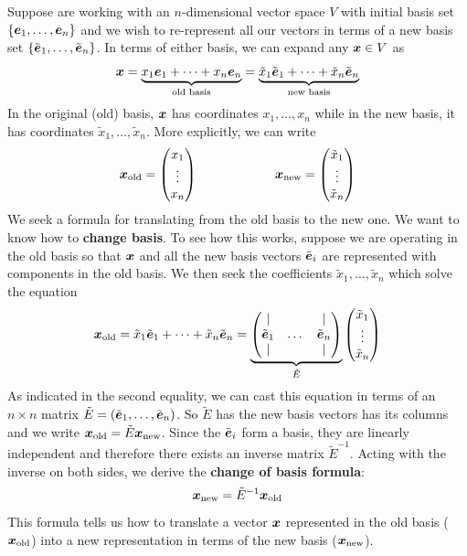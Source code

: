 \documentclass[onecolumn]{gwclass}
\begin{document}
Suppose are working with an $n$-dimensional vector space $V$ with initial basis set $\{\boldsymbol{e}_1,\dots,\boldsymbol{e}_n\}$ and we wish to re-represent all our vectors in terms of a new basis set $\{\tilde{\boldsymbol{e}}_1,\dots,\tilde{\boldsymbol{e}}_n\}$. In terms of either basis, we can expand any $\boldsymbol{x}\in V$ as
$$ \boldsymbol{x} = \underbrace{x_1\boldsymbol{e}_1 + \dots + x_n\boldsymbol{e}_n}_{\text{\normalfont{old basis}}} = \underbrace{\tilde{x}_1\tilde{\boldsymbol{e}}_1 + \dots + \tilde{x}_n\tilde{\boldsymbol{e}}_n}_{\text{\normalfont{new basis}}}
$$
In the original (old) basis, $\boldsymbol{x}$ has coordinates $x_1,\dots, x_n$ while in the new basis, it has coordinates $\tilde{x}_1,\dots,\tilde{x}_n$. More explicitly, we can write
$$\boldsymbol{x}_{\text{\normalfont{old}}}=\begin{pmatrix}
	x_1 \\
	\vdots \\
	x_n
\end{pmatrix} \qquad\qquad\qquad\boldsymbol{x}_{\text{\normalfont{new}}}=\begin{pmatrix}
	\tilde{x}_1 \\
	\vdots \\
	\tilde{x}_n
\end{pmatrix}$$
We seek a formula for translating from the old basis to the new one. We want to know how to \textbf{change basis}. To see how this works, suppose we are operating in the old basis so that $\boldsymbol{x}$ and all the new basis vectors $\tilde{\boldsymbol{e}}_i$ are represented with components in the old basis. We then seek the coefficients $\tilde{x}_1,\dots,\tilde{x}_n$ which solve the equation
$$ \boldsymbol{x}_{\text{\normalfont{old}}} = \tilde{x}_1\tilde{\boldsymbol{e}}_1 + \dots + \tilde{x}_n\tilde{\boldsymbol{e}}_n = \underbrace{\begin{pmatrix}
	| & & | \\
	\tilde{\boldsymbol{e}}_1 & \dots & \tilde{\boldsymbol{e}}_n \\
	| & & |
\end{pmatrix}}_{\tilde{E}}\begin{pmatrix}
	\tilde{x}_1 \\
	\vdots \\
	\tilde{x}_n
\end{pmatrix} $$
As indicated in the second equality, we can cast this equation in terms of an $n\times n$ matrix $\tilde{E}=(\tilde{\boldsymbol{e}}_1, \dots, \tilde{\boldsymbol{e}}_n)$. So $\tilde{E}$ has the new basis vectors has its columns and we write $\boldsymbol{x}_{\text{\normalfont{old}}} = \tilde{E}\boldsymbol{x}_{\text{\normalfont{new}}}$. Since the $\tilde{\boldsymbol{e}}_i$ form a basis, they are linearly independent and therefore there exists an inverse matrix $\tilde{E}^{-1}$. Acting with the inverse on both sides, we derive the \textbf{change of basis formula}:
$$ \boldsymbol{x}_{\text{\normalfont{new}}} = \tilde{E}^{-1}\boldsymbol{x}_{\text{\normalfont{old}}} $$
This formula tells us how to translate a vector $\boldsymbol{x}$ represented in the old basis ($\boldsymbol{x}_{\text{\normalfont{old}}}$) into a new representation in terms of the new basis ($\boldsymbol{x}_{\text{\normalfont{new}}}$). 
\end{document}
